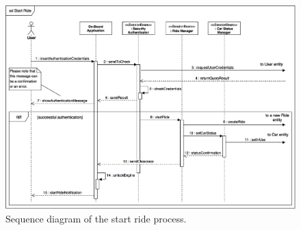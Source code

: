 \begin{figure}[H]
\begin{center}
		\includegraphics[width=\textwidth]{./arch_design/diagrams/start_ride_sd.png}
		\caption{Sequence diagram of the start ride process.}
		\label{start_ride_sd}
\end{center}
\end{figure}